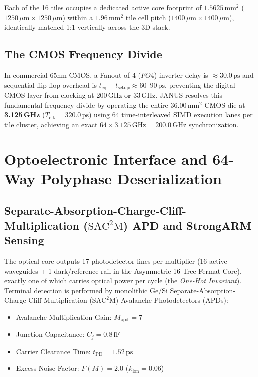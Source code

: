 \documentclass[10pt,journal,compsoc]{IEEEtran}
\begin{document}
Each of the 16 tiles occupies a dedicated active core footprint of \textbf{$1.5625\,\text{mm}^2$} ($1250\,\mu\text{m} \times 1250\,\mu\text{m}$) within a \textbf{$1.96\,\text{mm}^2$} tile cell pitch ($1400\,\mu\text{m} \times 1400\,\mu\text{m}$), identically matched 1:1 vertically across the 3D stack.

\subsection{The CMOS Frequency Divide}
In commercial 65nm CMOS, a Fanout-of-4 ($FO4$) inverter delay is $\approx 30.0\,\text{ps}$ and sequential flip-flop overhead is $t_{\text{cq}} + t_{\text{setup}} \approx 60\text{--}90\,\text{ps}$, preventing the digital CMOS layer from clocking at 200\,GHz or 33\,GHz. JANUS resolves this fundamental frequency divide by operating the entire $36.00\,\text{mm}^2$ CMOS die at \textbf{3.125\,GHz} ($T_{\text{clk}} = 320.0\,\text{ps}$) using 64 time-interleaved SIMD execution lanes per tile cluster, achieving an exact $64 \times 3.125\,\text{GHz} = 200.0\,\text{GHz}$ synchronization.

\section{Optoelectronic Interface and 64-Way Polyphase Deserialization}\label{sec:optoelectronic}

\subsection{Separate-Absorption-Charge-Cliff-Multiplication ($\mathrm{SAC^2M}$) APD and StrongARM Sensing}
The optical core outputs 17 photodetector lines per multiplier (16 active waveguides + 1 dark/reference rail in the Asymmetric 16-Tree Fermat Core), exactly one of which carries optical power per cycle (the \textit{One-Hot Invariant}). Terminal detection is performed by monolithic Ge/Si Separate-Absorption-Charge-Cliff-Multiplication ($\mathrm{SAC^2M}$) Avalanche Photodetectors (APDs):
\begin{itemize}
    \item Avalanche Multiplication Gain: $M_{\text{apd}} = 7$
    \item Junction Capacitance: $C_j = 0.8\,\text{fF}$
    \item Carrier Clearance Time: $t_{\text{PD}} = 1.52\,\text{ps}$
    \item Excess Noise Factor: $F(M) = 2.0$ ($k_{\text{ion}} = 0.06$)
\end{itemize}
\end{document}
